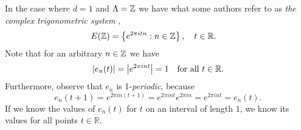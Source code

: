 \documentclass[../thesis.tex]{subfiles}
\begin{document}
\begin{example}
    In the case where $d=1$ and $\Lambda = \mathbb{Z}$ we have what some authors refer to as \emph{the complex trigonometric system} \cite{heilMetricsNormsInner2018} \cite{encyclopediaofmathematicsTrigonometricSystem},
    \begin{align*}
        E(\mathbb{Z}) &= \left\{e^{2\pi i t n} : n \in \mathbb{Z}\right\}, \quad t\in \mathbb{R}.
    \end{align*}
    Note that for an arbitrary $n \in \mathbb{Z}$ we have
    \begin{equation*}
        \left|e_{n}(t) \right|= \left|e^{2 \pi i n t}\right| = 1 \quad \text{for all } t\in \mathbb{R}.
    \end{equation*}
    Furthermore, observe that $e_n$ is 1-\emph{periodic}, because
    \begin{equation*}
        e_n(t+1) = e^{2 \pi i n (t+1)} = e^{2 \pi i n t} e^{2 \pi i n} = e^{2 \pi i n t} = e_n(t).
    \end{equation*}
    If we know the values of $e_n(t)$ for $t$ on an interval of length $1$, we know its values for all points $t\in \mathbb{R}$. %
\end{example}
\end{document}

